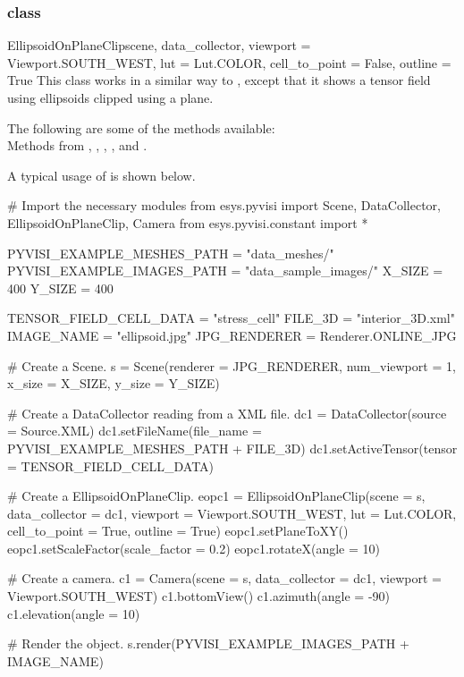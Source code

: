 \subsubsection{\EllipsoidOnPlaneClip class}

\begin{classdesc}{EllipsoidOnPlaneClip}{scene, data_collector,
viewport = Viewport.SOUTH_WEST, lut = Lut.COLOR, cell_to_point = False, 
outline = True}
This class works in a similar way to \MapOnPlaneClip, except that it shows a 
tensor field using ellipsoids clipped using a plane.
\end{classdesc}
        
The following are some of the methods available:\\
Methods from \ActorThreeD, \Sphere, \TensorGlyph, \Transform, \Clipper 
and \MaskPoints.

A typical usage of \EllipsoidOnPlaneClip is shown below.

\begin{python}
# Import the necessary modules
from esys.pyvisi import Scene, DataCollector, EllipsoidOnPlaneClip, Camera
from esys.pyvisi.constant import *

PYVISI_EXAMPLE_MESHES_PATH = "data_meshes/"
PYVISI_EXAMPLE_IMAGES_PATH = "data_sample_images/"
X_SIZE = 400
Y_SIZE = 400

TENSOR_FIELD_CELL_DATA = "stress_cell"
FILE_3D = "interior_3D.xml"
IMAGE_NAME = "ellipsoid.jpg"
JPG_RENDERER = Renderer.ONLINE_JPG

# Create a Scene.
s = Scene(renderer = JPG_RENDERER, num_viewport = 1, x_size = X_SIZE, 
        y_size = Y_SIZE)

# Create a DataCollector reading from a XML file.
dc1 = DataCollector(source = Source.XML)
dc1.setFileName(file_name = PYVISI_EXAMPLE_MESHES_PATH + FILE_3D)
dc1.setActiveTensor(tensor = TENSOR_FIELD_CELL_DATA)

# Create a EllipsoidOnPlaneClip.
eopc1 = EllipsoidOnPlaneClip(scene = s, data_collector = dc1, 
        viewport = Viewport.SOUTH_WEST, lut = Lut.COLOR, cell_to_point = True, 
        outline = True)
eopc1.setPlaneToXY()
eopc1.setScaleFactor(scale_factor = 0.2)
eopc1.rotateX(angle = 10)

# Create a camera.
c1 = Camera(scene = s, data_collector = dc1, viewport = Viewport.SOUTH_WEST)
c1.bottomView()
c1.azimuth(angle = -90)
c1.elevation(angle = 10)

# Render the object.
s.render(PYVISI_EXAMPLE_IMAGES_PATH + IMAGE_NAME)
\end{python}

